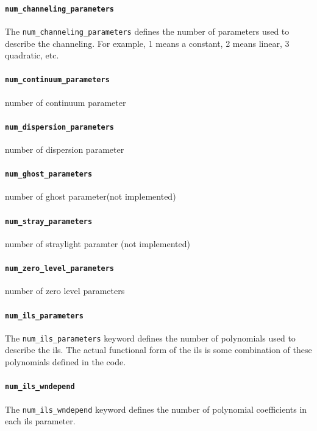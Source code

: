 \documentclass{article}
\begin{document}
\paragraph{\texttt{num\_channeling\_parameters}}

The \texttt{num\_channeling\_parameters} defines the number of
parameters used to describe the channeling.  For example, 1 means a
constant, 2 means linear, 3 quadratic, etc.

\paragraph{\texttt{num\_continuum\_parameters}}
number of continuum parameter
\paragraph{\texttt{num\_dispersion\_parameters}}
number of dispersion parameter
\paragraph{\texttt{num\_ghost\_parameters}}
number of ghost parameter(not implemented)
\paragraph{\texttt{num\_stray\_parameters}}
number of straylight paramter (not implemented)
\paragraph{\texttt{num\_zero\_level\_parameters}}
number of zero level parameters

\paragraph{\texttt{num\_ils\_parameters}}

The \texttt{num\_ils\_parameters} keyword defines the number of
polynomials used to describe the ils.  The actual functional form of
the ils is some combination of these polynomials defined in the code.

\paragraph{\texttt{num\_ils\_wndepend}}

The \texttt{num\_ils\_wndepend} keyword defines the number of
polynomial coefficients in each ils parameter.
\end{document}

